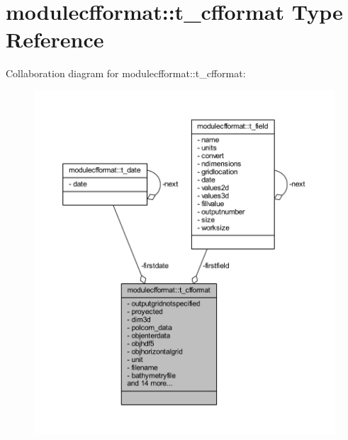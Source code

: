 \hypertarget{structmodulecfformat_1_1t__cfformat}{}\section{modulecfformat\+:\+:t\+\_\+cfformat Type Reference}
\label{structmodulecfformat_1_1t__cfformat}


Collaboration diagram for modulecfformat\+:\+:t\+\_\+cfformat\+:\nopagebreak
\begin{figure}[H]
\begin{center}
\leavevmode
\includegraphics[width=350pt]{structmodulecfformat_1_1t__cfformat__coll__graph}
\end{center}
\end{figure}
